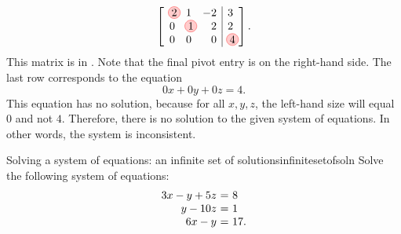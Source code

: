 \begin{solution}
  \begin{equation*}
    \leftB
    \begin{array}{rrr|r}
      \circled{2} &  1 &  -2 & 3\\
      0 &  \circled{1} &   2 & 2\\
      0 & 0 & 0 & \circled{4}
    \end{array}
    \rightB.
  \end{equation*}
  This matrix is in {\ef}. Note that the final pivot entry is on the
  right-hand side. The last row corresponds to the equation
  \begin{equation*}
    0x + 0y + 0z = 4.
  \end{equation*}
  This equation has no solution, because for all $x,y,z$, the
  left-hand size will equal $0$ and not $4$. Therefore, there is no
  solution to the given system of equations. In other words, the
  system is inconsistent.
\end{solution}

\begin{example}{Solving a system of equations: an infinite set of solutions}{infinitesetofsoln}
  Solve the following system of equations:
  \begin{equation}
    \begin{array}{r@{~}c@{~}l}
      3x  -y  +5z &=& 8 \\
           y -10z &=& 1 \\
      6x  -y      &=& 17.
    \end{array}
  \end{equation}
\end{example}

